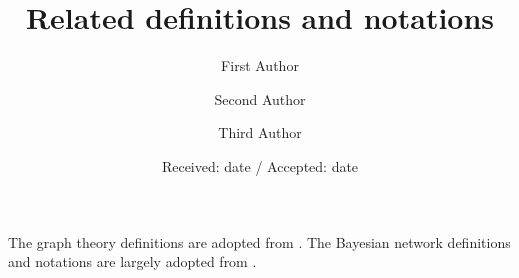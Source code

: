 \makeatletter
\newcommand*{\centernot}{%
  \mathpalette\@centernot
}
\def\@centernot#1#2{%
  \mathrel{%
    \rlap{%
      \settowidth\dimen@{$\m@th#1{#2}$}%
      \kern.5\dimen@
      \settowidth\dimen@{$\m@th#1=$}%
      \kern-.5\dimen@
      $\m@th#1\not$%
    }%
    {#2}%
  }%
}
\makeatother

%
%



\title{Related definitions and notations%
}


\author{First Author         \and
        Second Author \and
        Third Author
}



\date{Received: date / Accepted: date}

\maketitle

The graph theory definitions are adopted from \cite{diestel2000graph}. The Bayesian network definitions and notations are largely adopted from \cite{neapolitan2004learning}. 


